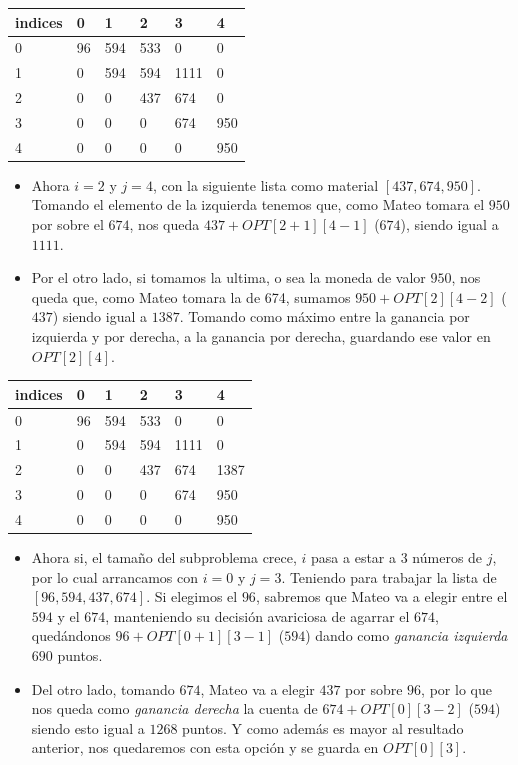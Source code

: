 \begin{table}[H]
    \centering
    \begin{tabular}{|l|l|l|l|l|l|}
    \hline
        indices & 0 & 1 & 2 & 3 & 4 \\ \hline
        0 & 96 & 594 & 533 & 0 & 0 \\ \hline
        1 & 0 & 594 & 594 & 1111 & 0 \\ \hline
        2 & 0 & 0 & 437 & 674 & 0 \\ \hline
        3 & 0 & 0 & 0 & 674 & 950 \\ \hline
        4 & 0 & 0 & 0 & 0 & 950 \\ \hline
    \end{tabular}
\end{table}
\begin{itemize}
    \item Ahora $i = 2$ y $j = 4$, con la siguiente lista como material $[437, 674, 950]$. Tomando el elemento de la izquierda tenemos que, como Mateo tomara el $950$ por sobre el $674$, nos queda $437 + OPT[2+1][4-1]$ ($674$), siendo igual a $1111$.
    \item Por el otro lado, si tomamos la ultima, o sea la moneda de valor $950$, nos queda que, como Mateo tomara la de 674, sumamos $950 + OPT[2][4-2]$ ($437$) siendo igual a $1387$. Tomando como máximo entre la ganancia por izquierda y por derecha, a la ganancia por derecha, guardando ese valor en $OPT[2][4]$.
\end{itemize}
\begin{table}[H]
    \centering
    \begin{tabular}{|l|l|l|l|l|l|}
    \hline
        indices & 0 & 1 & 2 & 3 & 4 \\ \hline
        0 & 96 & 594 & 533 & 0 & 0 \\ \hline
        1 & 0 & 594 & 594 & 1111 & 0 \\ \hline
        2 & 0 & 0 & 437 & 674 & 1387 \\ \hline
        3 & 0 & 0 & 0 & 674 & 950 \\ \hline
        4 & 0 & 0 & 0 & 0 & 950 \\ \hline
    \end{tabular}
\end{table}
\begin{itemize}
    \item Ahora si, el tamaño del subproblema crece, $i$ pasa a estar a $3$ números de $j$, por lo cual arrancamos con $i = 0$ y $j = 3$. Teniendo para trabajar la lista de $[96, 594, 437, 674]$. Si elegimos el $96$, sabremos que Mateo va a elegir entre el $594$ y el $674$, manteniendo su decisión avariciosa de agarrar el $674$, quedándonos $96 + OPT[0+1][3-1]$ ($594$) dando como \textit{ganancia izquierda} $690$ puntos.
    \item Del otro lado, tomando $674$, Mateo va a elegir $437$ por sobre $96$, por lo que nos queda como \textit{ganancia derecha} la cuenta de $674 + OPT[0][3-2]$ ($594$) siendo esto igual a $1268$ puntos. Y como además es mayor al resultado anterior, nos quedaremos con esta opción y se guarda en $OPT[0][3]$.
\end{itemize}
